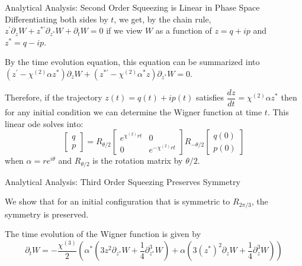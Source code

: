 \documentclass[final]{beamer}
\newlength{\colwidth}
\begin{document}
\begin{frame}[t]
\begin{columns}[t]
\begin{column}{\colwidth}
\begin{block}{Analytical Analysis: Second Order Squeezing is Linear in Phase Space}
        Differentiating both sides by $t$, we get, by the chain rule,
        $z^{\prime}\partial_{z}W+z^{*\prime}\partial_{z^{*}}W+\partial_{t}W=0$
        if we view $W$ as a function of $z=q+ip$ and $z^{*}=q-ip$.

        By the time evolution equation, this equation can be summarized into
        $(z^{\prime}-\chi^{(2)}\alpha z^{*})\partial_{z}W+(z^{*\prime}-\chi^{(2)}\alpha^{*} z)\partial_{z^{*}}W=0$.

        Therefore, if the trajectory $z(t)=q(t)+ip(t)$ satisfies $\dfrac{dz}{dt}=\chi^{(2)}\alpha z^{*}$
        then for any initial condition we can determine the Wigner function at time $t$.
        This linear ode solves into:
        \[
          \begin{bmatrix}
            q \\
            p
          \end{bmatrix}
          =
          R_{\theta/2}
          \begin{bmatrix}
            e^{\chi^{(2)}rt} & 0                 \\
            0                & e^{-\chi^{(2)}rt}
          \end{bmatrix}
          R_{-\theta/2}
          \begin{bmatrix}
            q(0) \\
            p(0)
          \end{bmatrix}
        \]
        when $\alpha=re^{i\theta}$ and $R_{\theta/2}$ is the rotation matrix by $\theta/2$.

      \end{block}

      \begin{block}{Analytical Analysis: Third Order Squeezing Preserves Symmetry}

        We show that for an initial configuration that is symmetric to $R_{2\pi/3}$, the symmetry is preserved.

        The time evolution of the Wigner function is given by
        \[\partial_{t}W=-\frac{\chi^{(3)}}{2}\left(\alpha^{*}\left(3z^{2}\partial_{z^{*}}W+\frac{1}{4}\partial_{z^{*}}^{3}W\right)+\alpha\left(3(z^{*})^{2}\partial_{z}W+\frac{1}{4}\partial_{z}^{3}W\right)\right)\]


\end{block}
\end{column}
\end{columns}
\end{frame}
\end{document}

